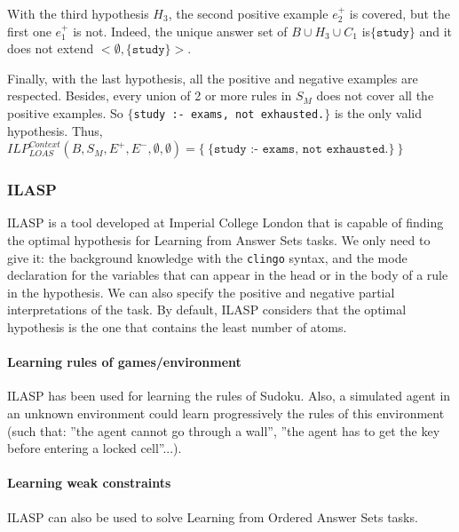 \begin{example}
\bigskip

With the third hypothesis $H_3$, the second positive example $e^+_2$ is covered, but the first one $e^+_1$ is not. Indeed, the unique answer set of $B\cup H_3 \cup C_1$ is$\{\texttt{study}\}$ and it does not extend $<\emptyset, \{\texttt{study}\}>$.

\bigskip

Finally, with the last hypothesis, all the positive and negative examples are respected. Besides, every union of 2 or more rules in $S_M$ does not cover all the positive examples. So $\{$\texttt{study :- exams, not exhausted.}$\}$ is the only valid hypothesis. Thus, $ILP_{LOAS}^{Context}(B, S_M, E^+, E^-, \emptyset, \emptyset) = \{\:\{\texttt{study :- exams, not exhausted.}\}\:\}$

\end{example}

\subsubsection{ILASP}

ILASP is a tool developed at Imperial College London that is capable of finding the optimal hypothesis for Learning from Answer Sets tasks. We only need to give it: the background knowledge with the \texttt{clingo} syntax, and the mode declaration for the variables that can appear in the head or in the body of a rule in the hypothesis. We can also specify the positive and negative partial interpretations of the task. By default, ILASP considers that the optimal hypothesis is the one that contains the least number of atoms.

\paragraph{Learning rules of games/environment}

ILASP has been used for learning the rules of Sudoku. Also, a simulated agent in an unknown environment could learn progressively the rules of this environment (such that: ”the agent cannot go through a wall”, ”the agent has to get the key before entering a locked cell”...).

\paragraph{Learning weak constraints}

ILASP can also be used to solve Learning from Ordered Answer Sets tasks.

